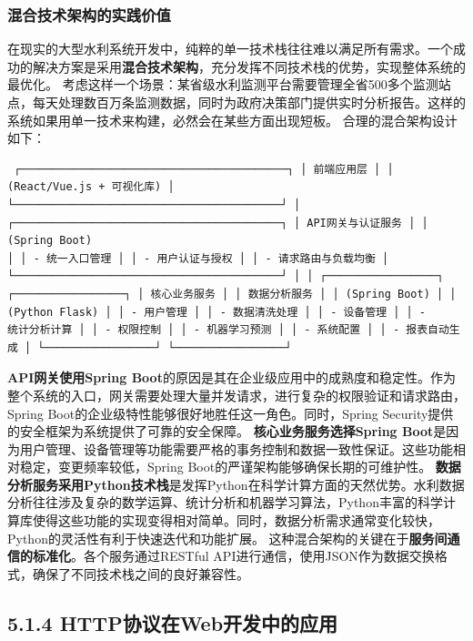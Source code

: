\subsubsection{混合技术架构的实践价值}\label{ux6df7ux5408ux6280ux672fux67b6ux6784ux7684ux5b9eux8df5ux4ef7ux503c}
在现实的大型水利系统开发中，纯粹的单一技术栈往往难以满足所有需求。一个成功的解决方案是采用\textbf{混合技术架构}，充分发挥不同技术栈的优势，实现整体系统的最优化。
考虑这样一个场景：某省级水利监测平台需要管理全省500多个监测站点，每天处理数百万条监测数据，同时为政府决策部门提供实时分析报告。这样的系统如果用单一技术来构建，必然会在某些方面出现短板。 合理的混合架构设计如下：
\begin{lstlisting} ┌─────────────────────────────────────────┐ │ 前端应用层 │ │ (React/Vue.js + 可视化库) │
└─────────────────────────────────────────┘ │ ┌─────────────────────────────────────────┐ │ API网关与认证服务 │ │ (Spring Boot)
│ │ - 统一入口管理 │ │ - 用户认证与授权 │ │ - 请求路由与负载均衡 │ └─────────────────────────────────────────┘ │ │ ┌─────────────────┐
┌─────────────────┐ │ 核心业务服务 │ │ 数据分析服务 │ │ (Spring Boot) │ │ (Python Flask) │ │ - 用户管理 │ │ - 数据清洗处理 │ │ - 设备管理 │ │ -
统计分析计算 │ │ - 权限控制 │ │ - 机器学习预测 │ │ - 系统配置 │ │ - 报表自动生成 │ └─────────────────┘ └─────────────────┘ \end{lstlisting}
\textbf{API网关使用Spring Boot}的原因是其在企业级应用中的成熟度和稳定性。作为整个系统的入口，网关需要处理大量并发请求，进行复杂的权限验证和请求路由，Spring
Boot的企业级特性能够很好地胜任这一角色。同时，Spring Security提供的安全框架为系统提供了可靠的安全保障。 \textbf{核心业务服务选择Spring
Boot}是因为用户管理、设备管理等功能需要严格的事务控制和数据一致性保证。这些功能相对稳定，变更频率较低，Spring Boot的严谨架构能够确保长期的可维护性。
\textbf{数据分析服务采用Python技术栈}是发挥Python在科学计算方面的天然优势。水利数据分析往往涉及复杂的数学运算、统计分析和机器学习算法，Python丰富的科学计算库使得这些功能的实现变得相对简单。同时，数据分析需求通常变化较快，Python的灵活性有利于快速迭代和功能扩展。
这种混合架构的关键在于\textbf{服务间通信的标准化}。各个服务通过RESTful API进行通信，使用JSON作为数据交换格式，确保了不同技术栈之间的良好兼容性。 \subsection{5.1.4
HTTP协议在Web开发中的应用}\label{httpux534fux8baeux5728webux5f00ux53d1ux4e2dux7684ux5e94ux7528}
